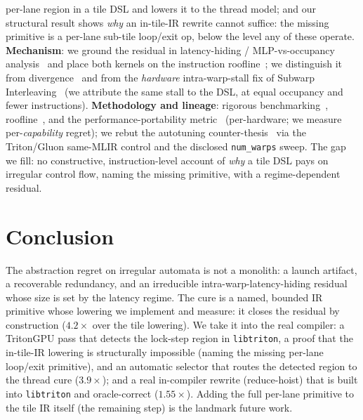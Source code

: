 \documentclass[sigplan,10pt]{acmart}
\begin{document}
per-lane region in a tile DSL and lowers it to the thread model; and our structural result shows
\emph{why} an in-tile-IR rewrite cannot suffice: the missing primitive is a per-lane sub-tile loop/exit
op, below the level any of these operate.
\textbf{Mechanism}: we ground the residual in latency-hiding / MLP-vs-occupancy
analysis~\cite{volkov2016latency,hongkim2009} and place both kernels on the instruction
roofline~\cite{instroofline2022}; we distinguish it from divergence~\cite{fung2007} and from the
\emph{hardware} intra-warp-stall fix of Subwarp Interleaving~\cite{subwarp2022} (we attribute the
same stall to the DSL, at equal occupancy and fewer instructions).
\textbf{Methodology and lineage}: rigorous benchmarking~\cite{hoefler2015}, roofline~\cite{roofline2009},
and the performance-portability metric~\cite{pennycook2016} (per-hardware; we measure per-\emph{capability}
regret); we rebut the autotuning counter-thesis~\cite{ringlein2025} via the Triton/Gluon same-MLIR
control and the disclosed \texttt{num\_warps} sweep. The gap we fill: no constructive,
instruction-level account of \emph{why} a tile DSL pays on irregular control flow, naming the missing
primitive, with a regime-dependent residual.

\section{Conclusion}
The abstraction regret on irregular automata is not a monolith: a launch artifact, a recoverable
redundancy, and an irreducible intra-warp-latency-hiding residual whose size is set by the latency
regime. The cure is a named, bounded IR primitive whose lowering we implement and measure: it closes
the residual by construction ($4.2\times$ over the tile lowering). We take it into the real compiler: a
TritonGPU pass that detects the lock-step region in \texttt{libtriton}, a proof that the in-tile-IR
lowering is structurally impossible (naming the missing per-lane loop/exit primitive), and an automatic
selector that routes the detected region to the thread cure ($3.9\times$); and a real in-compiler
rewrite (reduce-hoist) that is built into \texttt{libtriton} and oracle-correct ($1.55\times$). Adding the
full per-lane primitive to the tile IR itself (the remaining step) is the landmark future work.
\end{document}

